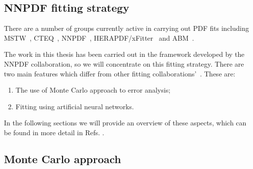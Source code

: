 \subsection{NNPDF fitting strategy}

There are a number of groups currently active in carrying out PDF fits including MSTW~\cite{Martin:2009bu}, CTEQ~\cite{Dulat:2015mca}, NNPDF~\cite{nnpdf}, HERAPDF/xFitter~\cite{CooperSarkar:2011aa} and ABM~\cite{Alekhin:2013nda}.

The work in this thesis has been carried out in the framework developed by the NNPDF collaboration, so we will concentrate on this fitting strategy. There are two main features which differ from other fitting collaborations'~\cite{Forte:2002fg}. These are:
\begin{enumerate}
\item  The use of Monte Carlo approach to error analysis;
    \item  Fitting using artificial neural networks.
\end{enumerate}

In the following sections we will provide an overview of these aspects, which can be found in more detail in Refs. \cite{Ball:2010de, Ball:2012cx, Ball:2017nwa}.
\subsection{Monte Carlo approach}

